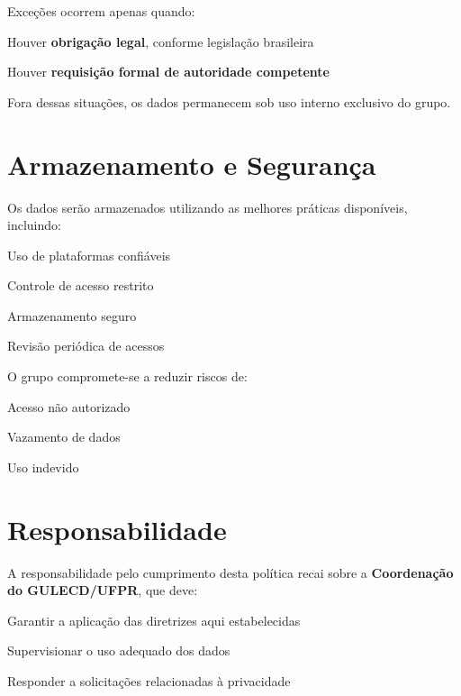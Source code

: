\documentclass[
  12pt,          %
  a4paper,       %
  oneside,       %
  brazil         %
]{article}
\begin{document}
Exceções ocorrem apenas quando:

\begin{privacidade}
	\item Houver \textbf{obrigação legal}, conforme legislação brasileira
	\item Houver \textbf{requisição formal de autoridade competente}
\end{privacidade}

Fora dessas situações, os dados permanecem sob uso interno exclusivo do grupo.

\section{Armazenamento e Segurança}

Os dados serão armazenados utilizando as melhores práticas disponíveis, incluindo:

\begin{privacidade}
	\item Uso de plataformas confiáveis
	\item Controle de acesso restrito
	\item Armazenamento seguro
	\item Revisão periódica de acessos
\end{privacidade}

O grupo compromete-se a reduzir riscos de:

\begin{privacidade}
	\item Acesso não autorizado
	\item Vazamento de dados
	\item Uso indevido
\end{privacidade}

\section{Responsabilidade}

A responsabilidade pelo cumprimento desta política recai sobre a \textbf{Coordenação do GULECD/UFPR}, que deve:

\begin{privacidade}
	\item Garantir a aplicação das diretrizes aqui estabelecidas
	\item Supervisionar o uso adequado dos dados
	\item Responder a solicitações relacionadas à privacidade
\end{privacidade}
\end{document}
